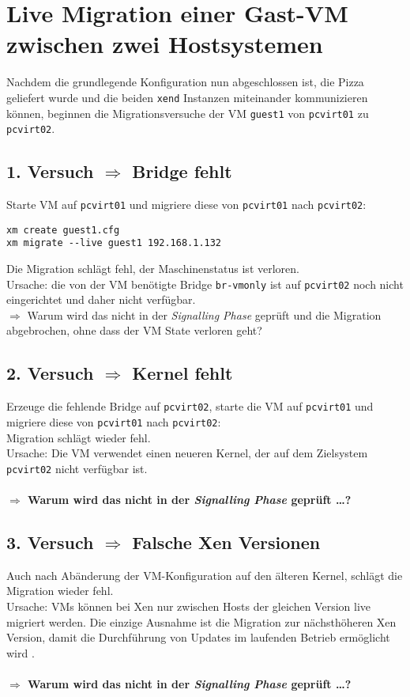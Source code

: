 \section{Live Migration einer Gast-VM zwischen zwei Hostsystemen}
Nachdem die grundlegende Konfiguration nun abgeschlossen ist, die Pizza geliefert wurde und die beiden \verb#xend# Instanzen miteinander kommunizieren können, beginnen die Migrationsversuche der VM \verb#guest1# von \verb#pcvirt01# zu \verb#pcvirt02#.

\subsection{1. Versuch $\Rightarrow$ Bridge fehlt}
Starte VM auf \verb#pcvirt01# und migriere diese von \verb#pcvirt01# nach \verb#pcvirt02#:
\setupVerbatimOut
\begin{verbatim}
xm create guest1.cfg
xm migrate --live guest1 192.168.1.132
\end{verbatim}

Die Migration schlägt fehl, der Maschinenstatus ist verloren. 
\\
Ursache: die von der VM benötigte Bridge \verb#br-vmonly# ist auf \verb#pcvirt02# noch nicht eingerichtet und daher nicht verfügbar.
\\
$\Rightarrow$ Warum wird das nicht in der \emph{Signalling Phase} geprüft und die Migration abgebrochen, ohne dass der VM State verloren geht? 

\subsection {2. Versuch $\Rightarrow$ Kernel fehlt}
Erzeuge die fehlende Bridge auf \verb#pcvirt02#, starte die VM auf \verb#pcvirt01# und migriere diese von \verb#pcvirt01# nach \verb#pcvirt02#:
\\
Migration schlägt wieder fehl.\\ 
Ursache: Die VM verwendet einen neueren Kernel, der auf dem Zielsystem \verb#pcvirt02# nicht verfügbar ist.
\\
\\
\large
\textbf{$\Rightarrow$ Warum wird das nicht in der \emph{Signalling Phase} geprüft \dots?}
\normalsize

\subsection {3. Versuch $\Rightarrow$ Falsche Xen Versionen}
Auch nach Abänderung der VM-Konfiguration auf den älteren Kernel, schlägt die Migration wieder fehl. 
\\
Ursache: VMs können bei Xen nur zwischen Hosts der gleichen Version live migriert werden. Die einzige Ausnahme ist die Migration zur nächsthöheren Xen Version, damit die Durchführung von Updates im laufenden Betrieb ermöglicht wird \cite{wiki_xen_version}.
\\
\\
\Large
\textbf{$\Rightarrow$ Warum wird das nicht in der \emph{Signalling Phase} geprüft \dots?}
\normalsize

